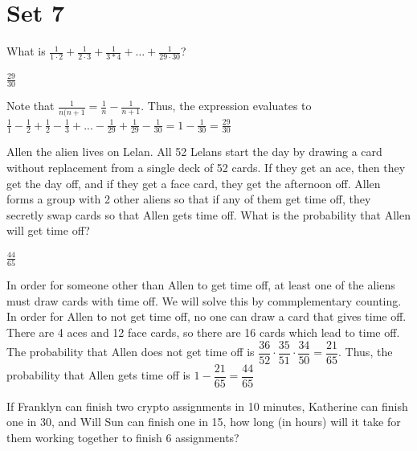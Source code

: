 \documentclass[11pt]{article}
\begin{document}
\newpage
\section*{Set 7}
\begin{problem}
What is $\frac{1}{1\cdot2}+\frac{1}{2\cdot3} + \frac{1}{3*4} + \dots + \frac{1}{29\cdot30}$?
\end{problem}

\begin{answer}
$\frac{29}{30}$
\end{answer}

\begin{solution}
Note that $\frac{1}{n(n+1} = \frac{1}{n} - \frac{1}{n+1}$. Thus, the expression evaluates to $\frac{1}{1} - \frac{1}{2} + \frac{1}{2} - \frac{1}{3} + ... - \frac{1}{29} + \frac{1}{29} - \frac{1}{30} = 1-\frac{1}{30} = \boxed{\frac{29}{30}}$
\end{solution}

\begin{problem}
Allen the alien lives on Lelan. All 52 Lelans start the day by drawing a card without replacement from a single deck of 52 cards. If they get an ace, then they get the day off, and if they get a face card, they get the afternoon off. Allen forms a group with 2 other aliens so that if any of them get time off, they secretly swap cards so that Allen gets time off. What is the probability that Allen will get time off?
\end{problem}

\begin{answer}
$\frac{44}{65}$
\end{answer}

\begin{solution}
In order for someone other than Allen to get time off, at least one of the aliens must draw cards with time off. We will solve this by commplementary counting. In order for Allen to not get time off, no one can draw a card that gives time off. There are 4 aces and 12 face cards, so there are 16 cards which lead to time off. The probability that Allen does not get time off is $\dfrac{36}{52}\cdot \dfrac{35}{51} \cdot \dfrac{34}{50} = \dfrac{21}{65}$. Thus, the probability that Allen gets time off is $1-\dfrac{21}{65} = \boxed{\dfrac{44}{65}}$
\end{solution}

\begin{problem}
If Franklyn can finish two crypto assignments in 10 minutes, Katherine can finish one in 30, and Will Sun can finish one in 15, how long (in hours) will it take for them working together to finish 6 assignments?
\end{problem}
\end{document}
